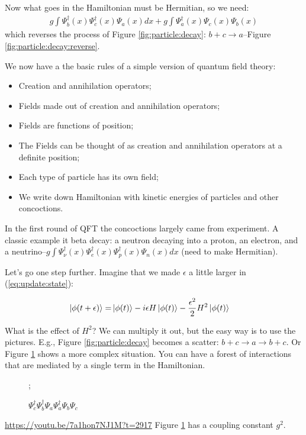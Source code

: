 \documentclass[]{article}
\begin{document}
Now what goes in the Hamiltonian must be Hermitian, so we need:
\begin{align*}
	g \int \Psi^\dagger_b(x) \Psi^\dagger_c(x) \Psi_a(x) dx + g \int \Psi^\dagger_a(x) \Psi_c(x) \Psi_b(x)
\end{align*}
which reverses the process of  Figure \ref{fig:particle:decay}: $b+c\rightarrow a$--Figure \ref{fig:particle:decay:reverse}.

We now have a the basic rules of a simple version of quantum field theory:
\begin{itemize}
	\item Creation and annihilation operators;
	\item Fields made out of creation and annihilation operators;
	\item Fields are functions of position;
	\item The Fields can be thought of as creation and annihilation operators at a definite position;
	\item Each type of particle has its own field;
	\item We write down Hamiltonian with kinetic energies of particles and other concoctions. 
\end{itemize}

In the first round of QFT the concoctions largely came from experiment. A classic example it beta decay: a neutron decaying into a proton, an electron, and a neutrino--$g \int \Psi^\dagger_{\nu}(x) \Psi^\dagger_e(x) \Psi^\dagger_p(x) \Psi_n(x) dx$ (need to make Hermitian).

Let's go one step further. Imagine that we made $\epsilon$ a little larger in (\ref{eq:update:state}):

\begin{align*}
	\ket{\phi(t+\epsilon)} =& \ket{\phi(t)} -i \epsilon H \ket{\phi(t)} - \frac{\epsilon^2}{2} H^2 \ket{\phi(t)}
\end{align*}

What is the effect of $H^2$? We can multiply it out, but the easy way is to use the pictures. E.g., Figure \ref{fig:particle:decay} becomes a scatter: $b+c \rightarrow a \rightarrow b + c$. Or Figure \ref{fig:scatter:annihilate} shows a more complex situation. You can have a forest of interactions that are mediated by a single term in the Hamiltonian.

\begin{figure}[H]
	\begin{center}
		\caption{$\Psi^\dagger_c\Psi^\dagger_b\Psi_a\Psi^\dagger_a\Psi_b\Psi_c$}\label{fig:scatter:annihilate}
		;
	\end{center}
\end{figure}
\url{https://youtu.be/7a1hon7NJ1M?t=2917}
Figure \ref{fig:scatter:annihilate} has a coupling constant $g^2$.
\end{document}
